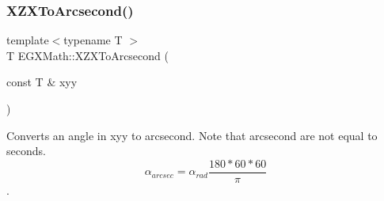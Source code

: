 \mbox{\label{group___e_g_x_math-_angle_conversions-_x_z_x_gaebb234b957f08dcd4f84726bcd3cdf62}} 
\subsubsection{\texorpdfstring{X\+Z\+X\+To\+Arcsecond()}{XZXToArcsecond()}}
{\footnotesize\ttfamily template$<$typename T $>$ \\
T E\+G\+X\+Math\+::\+X\+Z\+X\+To\+Arcsecond (\begin{DoxyParamCaption}\item[{const T \&}]{xyy }\end{DoxyParamCaption})}



Converts an angle in xyy to arcsecond. Note that arcsecond are not equal to seconds. \[\alpha_{arcsec}=\alpha_{rad}\frac{180 * 60 * 60}{\pi}\]. 

